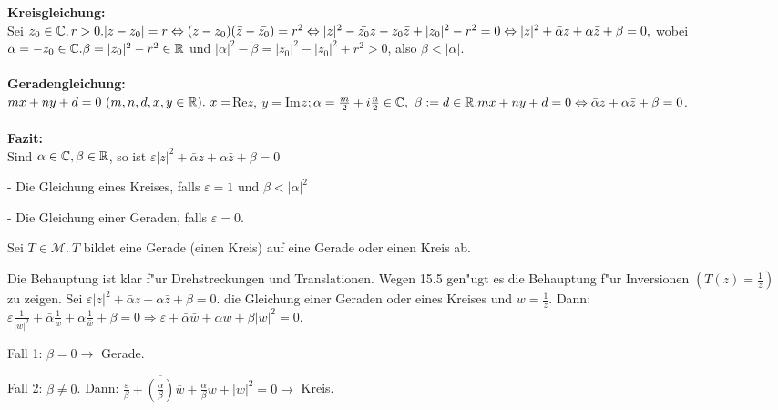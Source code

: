 \documentclass[a4paper,twoside,DIV15,BCOR12mm]{scrbook}
\begin{document}
{\bf Kreisgleichung:}\\
Sei $z_0 \in \mathbb{C}, r>0. |z-z_0|=r \Leftrightarrow (z-z_0)(\bar{z}-\bar{z_0}) = r^2 \Leftrightarrow |z|^2 - \bar{z_0}z-z_0\bar{z}+|z_0|^2-r^2=0 \Leftrightarrow |z|^2 + \bar{\alpha}z + \alpha\bar{z}+\beta=0,$ wobei $\alpha = -z_0 \in \mathbb{C}. \beta = |z_0|^2-r^2 \in \mathbb{R}$ und $|\alpha|^2-\beta = |z_0|^2-|z_0|^2+r^2 > 0$, also $ \beta < |\alpha|$.\\
\\
{\bf Geradengleichung:}\\
$mx+ny+d=0 \ (m,n,d,x,y \in \mathbb{R}). \ x = $Re$ z, \ y= $Im$ z; \alpha = \frac{m}{2}+i\frac{n}{2} \in \MdC, \ \beta := d \in \MdR. mx+ny+d = 0 \Leftrightarrow \bar{\alpha}z+\alpha\bar{z}+\beta=0$.\\
\\
{\bf Fazit:}\\
Sind $\alpha \in \mathbb{C}, \beta \in \mathbb{R}$, so ist $\varepsilon |z|^2 + \bar{\alpha}z + \alpha\bar{z}+\beta = 0$
\begin{liste}
\item[-] Die Gleichung eines Kreises, falls $\varepsilon = 1$ und $\beta < |\alpha|^2$
\item[-] Die Gleichung einer Geraden, falls $\varepsilon = 0.$
\end{liste}

\begin{satz}
Sei $T \in \mathcal{M}.\ T$ bildet eine Gerade (einen Kreis) auf eine Gerade oder einen Kreis ab.
\end{satz}

\begin{beweis}
Die Behauptung ist klar f"ur Drehstreckungen und Translationen. Wegen 15.5 gen"ugt es die Behauptung f"ur Inversionen $(T(z) = \frac1z)$ zu zeigen. Sei $\varepsilon|z|^2 + \bar{\alpha}z + \alpha\bar{z}+\beta =0$. die Gleichung einer Geraden oder eines Kreises und $w = \frac1z$. Dann: $\varepsilon \frac1{|w|^2}+ \bar{\alpha}\frac1w + \alpha \frac1{\bar{w}}+ \beta = 0 \Rightarrow \varepsilon + \bar{\alpha}\bar{w}+\alpha w + \beta |w|^2 = 0.$
\begin{liste}
\item[Fall 1:] $\beta = 0 \rightarrow$ Gerade.
\item[Fall 2:] $\beta \not=0$. Dann: $\frac{\varepsilon}{\beta} + \overline{\left(\frac{\alpha}{\beta}\right)} \bar{w} + \frac{\alpha}{\beta}w + |w|^2 = 0 \rightarrow$ Kreis.
\end{liste}
\end{beweis}
\end{document}
